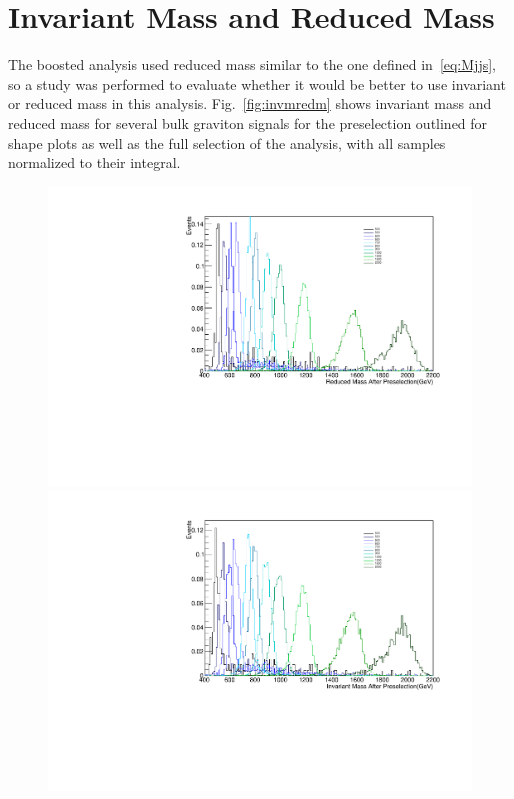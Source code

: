 \section{Invariant Mass and Reduced Mass\label{app:redm}}
The boosted analysis used reduced mass similar to the one defined in~\ref{eq:Mjjs}, so a study was performed to evaluate whether it would be better to use invariant or reduced mass in this analysis. Fig.~\ref{fig:invmredm} shows invariant mass and reduced mass for several bulk graviton signals for the preselection outlined for shape plots as well as the full selection of the analysis, with all samples normalized to their integral.

\begin{figure}[h]
\begin{center}
\includegraphics[scale=0.34]{Figures/redmPS.pdf}
\includegraphics[scale=0.34]{Figures/invmPS.pdf}\\

\end{center}
\end{figure}
